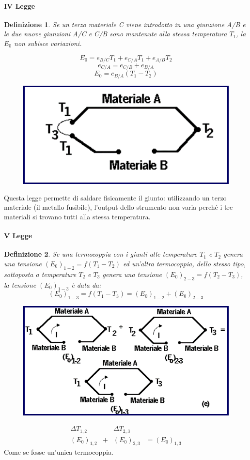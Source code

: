 \documentclass[a4paper, 15pt]{article}
\newtheorem*{definizione}{Definizione}
\begin{document}
\paragraph{IV Legge} 		
\begin{definizione}		
	Se un terzo materiale C viene introdotto in una giunzione A/B e le due nuove
	giunzioni A/C e C/B sono mantenute alla stessa temperatura $T_1$, la $E_0$ non
	subisce variazioni.
\end{definizione}
	\[E_0 = e_{B/C}T_1 + e_{C/A}T_1+e_{A/B}T_2\]
	\[e_{C/A} = e_{C/B} + e_{B/A}\]
	\[E_0 = e_{B/A}(T_1-T_2) \]
	\begin{figure}[H]
		\centering
		\includegraphics[width=0.5\linewidth]{immagini/screenshot023}
		\label{fig:screenshot023}
	\end{figure}
	Questa legge permette di saldare fisicamente il giunto: utilizzando un terzo materiale (il metallo fusibile), l'output dello strumento non varia perché i tre materiali si trovano tutti alla stessa temperatura. 
	
\paragraph{V Legge} 		
\begin{definizione}		
	Se una termocoppia con i giunti alle temperature $T_1$ e $T_2$ genera una tensione
	$(E_0)_{1-2}=f(T_1-T_2)$ ed un'altra termocoppia, dello stesso tipo, sottoposta a
	temperature $T_2$ e $T_3$ genera una tensione $(E_0)_{2-3}=f(T_2-T_3)$, la tensione $(E_0)_{1-3}$ è data da:
	\[(E_0)_{1-3} = f(T_1-T_3) = (E_0)_{1-2} + (E_0)_{2-3} \]
\end{definizione}	
	\begin{figure}[H]
		\centering
		\includegraphics[width=0.5\linewidth]{immagini/screenshot024}
		\label{fig:screenshot024}
	\end{figure}		
	\[\boxed{\begin{matrix}
		\Delta T_{1,2} &        &\Delta T_{2,3}    &      \\
		(E_0)_{1,2} & + & (E_0)_{2,3} & = (E_0)_{1,3}
	\end{matrix}}\]
	Come se fosse un'unica termocoppia. \newline 
	
\end{document}
